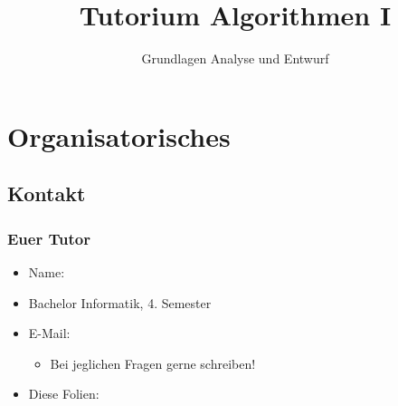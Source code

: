 

\title[Tutorium Algorithmen I]{Tutorium Algorithmen I}
\subtitle{Grundlagen Analyse und Entwurf}



\begin{frame}
  \titlepage
\end{frame}


\section{Organisatorisches}
\subsection{Kontakt}
\begin{frame}
  \frametitle{Euer Tutor}
  \begin{itemize}
    \item Name: \authorName
    \item Bachelor Informatik, 4. Semester
    \item E-Mail: \authorEmail
      \begin{itemize}
      \item Bei jeglichen Fragen gerne schreiben!
      \end{itemize}
    \item Diese Folien: \authorHomepage
  \end{itemize}
\end{frame}

